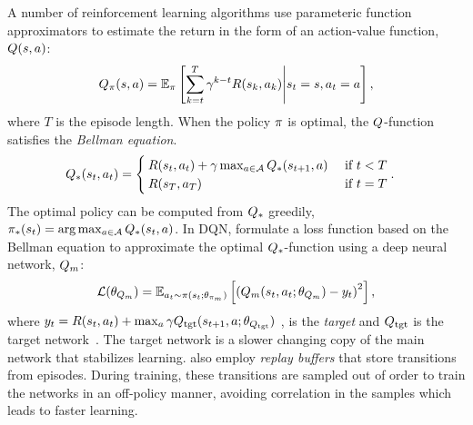 A number of reinforcement learning algorithms use parameteric function
approximators to estimate the return in the form of 
an action-value function, $Q(s, a)$:
%
\begin{align}
Q_\pi(s, a) = \mathbb{E}_\pi\left[ \sum_{k=t}^T
  \gamma^{k-t} R(s_k, a_k)
  \middle| s_t = s, a_t = a \right] ,
  \label{eq:q-def}
\end{align}%
where $T$ is the episode length.
%
When the policy $\pi$ is optimal, the $Q$-function satisfies the
\emph{Bellman equation}.
%
\begin{align}
    Q_{*}(s_t, a_t)
  &=
    \begin{cases}
        R(s_t, a_t) + \gamma \max_{a \in \mathcal{A}}
        Q_{*}(s_{t+1}, a)
      & \text{ if } t < T
      \\
      R(s_T, a_T) & \text{ if } t = T
    \end{cases}.
  \label{eq:bellman}
\end{align}%
%
\newcommand{\Qstar}{\Q_{*}}
\newcommand{\Qtgt}{\Q_{\text{tgt}}}
\newcommand{\ytgt}{y_t}
The optimal policy can be computed from $Q_{*}$ greedily, 
$\pi_*(s_t) = \arg \max_{a \in \mathcal{A}} Q_*(s_t,
a)$.
In DQN, \citet{mnih2013playing} formulate a loss function based on 
the Bellman equation to approximate the optimal $\Qstar$-function using
a deep neural network, $Q_m$:
%
%
\begin{align}
  \mathcal{L}(\theta_{Q_m}) =
    \mathbb{E}_{a_t\sim\pi(s_t; \theta_{\pi_m})}\left[\left(
  Q_m(s_t, a_t; \theta_{Q_m}) -
  y_t  \right)^2\right],
  \label{eq:bellman-dqn}
\end{align}
where 
$\ytgt = \Rew(\state_t, \act_t) + \max_{\act}\discount \Qtgt(\state_{t+1}, \act; \param_{\Qtgt}) $
, is the \emph{target} and $\Qtgt$ is the target
network~\citep{MnKaSiNATURE2015}.
The target network is a slower
changing copy of the main network that stabilizes learning.
\citet{MnKaSiNATURE2015} also employ \emph{replay buffers}
that store transitions from episodes. During training, these transitions are
sampled out of order to train the networks in an off-policy manner, avoiding
correlation in the samples which leads to faster learning.

